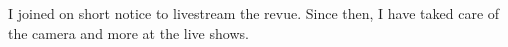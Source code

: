 
I joined on short notice to livestream the revue. Since then, I have taked care of the camera and more at
the live shows.
